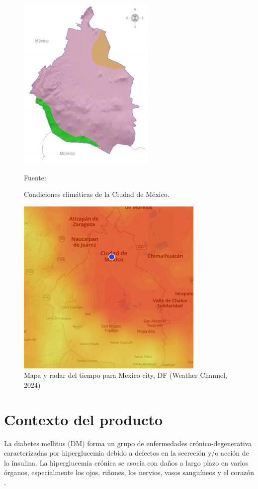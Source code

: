 \begin{figure}[H]
	\centering
	\includegraphics[width=0.6\linewidth]{figures/climadf}
	\caption{Condiciones climáticas de la Ciudad de México.}
	Fuente: \cite{clima-df}
	\label{fig:climadf}
\end{figure}

\begin{figure}[H]
	\centering
	\includegraphics[width=0.6\linewidth]{figures/calordf}
	\caption{Mapa y radar del tiempo para Mexico city, DF (Weather Channel, 2024)}
	\label{fig:calordf}
\end{figure}


\section{Contexto del producto}


La diabetes mellitus (DM) forma un grupo de enfermedades crónico-degenerativa caracterizadas por hiperglucemia debido a defectos en la secreción y/o acción de la insulina. La hiperglucemia crónica se asocia con daños a largo plazo en varios órganos, especialmente los ojos, riñones,  los nervios, vasos sanguíneos y el corazón \cite{alfaro2002}.

